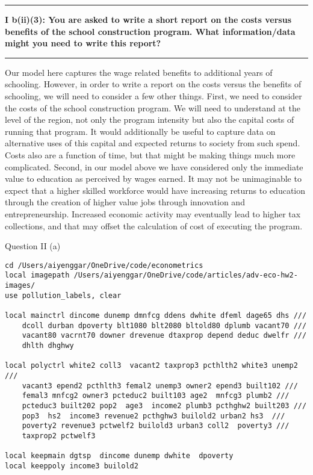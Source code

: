\documentclass[12pt]{article}
\newcommand\question[2]{\vspace{1em}\hrule\vspace{1em}\textbf{#1: #2}\vspace{1em}\hrule\vspace{1em}}
\begin{document}
\question{I b(ii)(3)}{You are asked to write a short report on the costs versus benefits of the school construction program. What information/data might you need to write this report?}
Our model here captures the wage related benefits to additional years of schooling. However, in order to write a report on the costs versus the benefits of schooling, we will need to consider a few other things. First, we need to consider the costs of the school construction program. We will need to understand at the level of the region, not only the program intensity but also the capital costs of running that program. It would additionally be useful to capture data on alternative uses of this capital and expected returns to society from such spend. Costs also are a function of time, but that might be making things much more complicated. Second, in our model above we have considered only the immediate value to education as perceived by wages earned. It may not be unimaginable to expect that a higher skilled workforce would have increasing returns to education through the creation of higher value jobs through innovation and entrepreneurship. Increased economic activity may eventually lead to higher tax collections, and that may offset the calculation of cost of executing the program. 

\newpage
\begin{center}\LARGE{Question II (a)}\end{center}
\begin{lstlisting}
cd /Users/aiyenggar/OneDrive/code/econometrics
local imagepath /Users/aiyenggar/OneDrive/code/articles/adv-eco-hw2-images/
use pollution_labels, clear

local mainctrl dincome dunemp dmnfcg ddens dwhite dfeml dage65 dhs ///
	dcoll durban dpoverty blt1080 blt2080 bltold80 dplumb vacant70 ///
	vacant80 vacrnt70 downer drevenue dtaxprop depend deduc dwelfr ///
	dhlth dhghwy

local polyctrl white2 coll3  vacant2 taxprop3 pcthlth2 white3 unemp2 ///
	vacant3 epend2 pcthlth3 femal2 unemp3 owner2 epend3 built102 ///
	femal3 mnfcg2 owner3 pcteduc2 built103 age2  mnfcg3 plumb2 ///
	pcteduc3 built202 pop2  age3  income2 plumb3 pcthghw2 built203 ///
	pop3  hs2  income3 revenue2 pcthghw3 builold2 urban2 hs3  ///
	poverty2 revenue3 pctwelf2 builold3 urban3 coll2  poverty3 ///
	taxprop2 pctwelf3
           
local keepmain dgtsp  dincome dunemp dwhite  dpoverty                
local keeppoly income3 builold2
\end{lstlisting}
\end{document}
